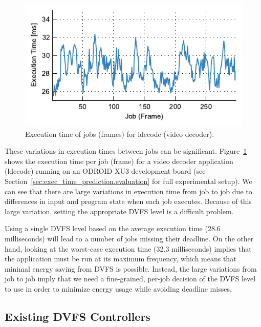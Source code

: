 \begin{figure}
  \begin{center}
    \includegraphics{exec_time_prediction/figs/ldecode_time.pdf}
    \caption{Execution time of jobs (frames) for ldecode (video decoder).}
    \label{fig:exec_time_prediction.applications.ldecode_time}
  \end{center}
\end{figure}

These variations in execution times between jobs can be significant.
Figure~\ref{fig:exec_time_prediction.applications.ldecode_time} shows the
execution time per job (frame) for a video decoder application (ldecode)
running on an ODROID-XU3 development board (see
Section~\ref{sec:exec_time_prediction.evaluation} for full experimental setup).
We can see that there are large variations in execution time from job to job
due to differences in input and program state when each job executes. Because
of this large variation, setting the appropriate DVFS level is a difficult
problem. 

Using a single DVFS level based on the average execution time (28.6
milliseconds) will lead to a number of jobs missing their deadline. On the
other hand, looking at the worst-case execution time (32.3 milliseconds)
implies that the application must be run at its maximum frequency, which means
that minimal energy saving from DVFS is possible. Instead, the large variations
from job to job imply that we need a fine-grained, per-job decision of the DVFS
level to use in order to minimize energy usage while avoiding deadline misses.

\subsection{Existing DVFS Controllers}
\label{sec:exec_time_prediction.applications.existing}

